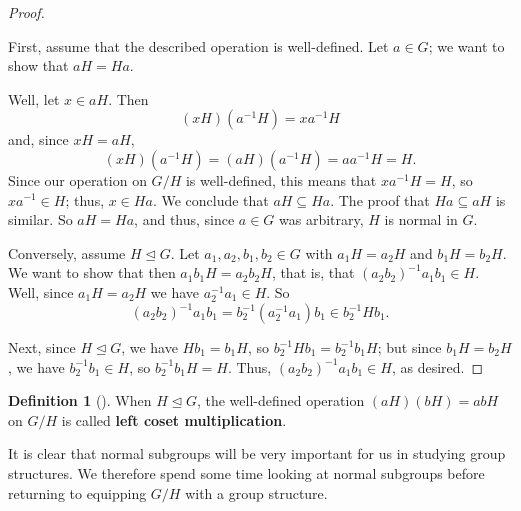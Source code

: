 \documentclass[10pt,]{book}
\newcommand{\terminology}[1]{\textbf{#1}}
\theoremstyle{plain}
\theoremstyle{definition}
\newtheorem{definition}[theorem]{Definition}
\theoremstyle{definition}
\theoremstyle{definition}
\theoremstyle{definition}
\numberwithin{equation}{section}
\begin{document}
\begin{proof}\hypertarget{proof-45}{}
First, assume that the described operation is well-defined. Let \(a\in G\); we want to show that \(aH=Ha\).%
\par
Well, let \(x\in aH\). Then%
\begin{equation*}
(xH)(a^{-1}H)=xa^{-1}H
\end{equation*}
and, since \(xH=aH\),%
\begin{equation*}
(xH)(a^{-1}H)=(aH)(a^{-1}H)=aa^{-1}H=H.
\end{equation*}
Since our operation on \(G/H\) is well-defined, this means that \(xa^{-1}H=H\), so \(xa^{-1}\in H\); thus, \(x\in Ha\). We conclude that \(aH\subseteq Ha\). The proof that \(Ha\subseteq aH\) is similar. So \(aH=Ha\), and thus, since \(a\in G\) was arbitrary, \(H\) is normal in \(G\).%
\par
Conversely, assume \(H\unlhd  G\). Let \(a_1,a_2,b_1,b_2\in G\) with \(a_1H=a_2H\) and \(b_1H=b_2H\). We want to show that then \(a_1b_1H=a_2b_2H\), that is, that \((a_2b_2)^{-1}a_1b_1\in H\). Well, since \(a_1H=a_2H\) we have \(a_2^{-1}a_1\in H\). So%
\begin{equation*}
(a_2b_2)^{-1}a_1b_1=b_2^{-1}(a_2^{-1}a_1)b_1 \in b_2^{-1}Hb_1.
\end{equation*}
%
\par
Next, since \(H\unlhd G\), we have \(Hb_1=b_1H\), so \(b_2^{-1}Hb_1=b_2^{-1}b_1H\); but since \(b_1H=b_2H\), we have \(b_2^{-1}b_1\in H\), so \(b_2^{-1}b_1H=H\). Thus, \((a_2b_2)^{-1}a_1b_1\in H\), as desired.%
\end{proof}
\begin{definition}[{}]\label{definition-66}
When \(H\unlhd G\), the well-defined operation \((aH)(bH)=abH\) on \(G/H\) is called \terminology{left coset multiplication}.%
\end{definition}
It is clear that normal subgroups will be very important for us in studying group structures. We therefore spend some time looking at normal subgroups before returning to equipping \(G/H\) with a group structure.%
\typeout{************************************************}
\typeout{************************************************}
\end{document}
